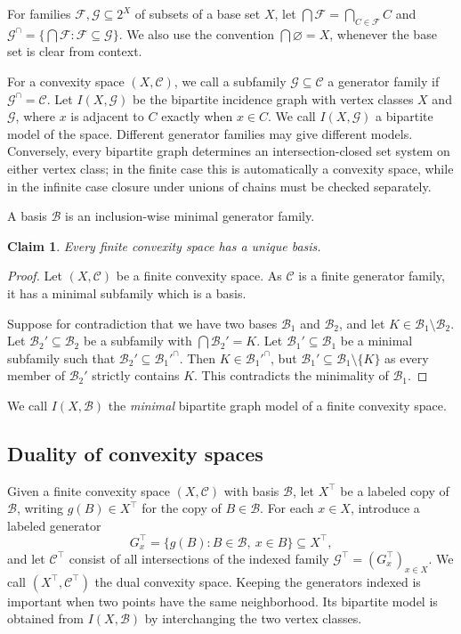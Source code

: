 \documentclass[11pt]{article}
\newtheorem{claim}[thm]{Claim}
\theoremstyle{definition}
\newcommand{\F}{\mathcal{F}}
\newcommand{\C}{\mathcal{C}}
\newcommand{\B}{\mathcal{B}}
\newcommand{\G}{\mathcal{G}}
\begin{document}
For families $\F,\G \subseteq 2^X$ of subsets of a base set $X$, let $\bigcap \F = \bigcap_{C\in \F} C$ and $\G^\cap = \{\bigcap \F: \F \subseteq \G\}$.
We also use the convention $\bigcap \varnothing = X$, whenever the base set is clear from context.

For a convexity space $(X,\C)$, we call a subfamily $\G\subseteq\C$ a generator family if $\G^\cap=\C$. Let $I(X,\G)$ be the bipartite incidence graph with vertex classes $X$ and $\G$, where $x$ is adjacent to $C$ exactly when $x\in C$. We call $I(X,\G)$ a bipartite model of the space. Different generator families may give different models. Conversely, every bipartite graph determines an intersection-closed set system on either vertex class; in the finite case this is automatically a convexity space, while in the infinite case closure under unions of chains must be checked separately.

A basis $\B$ is an inclusion-wise minimal generator family.

\begin{claim}\label{cl:uniqueBasis}
    Every finite convexity space has a unique basis.
\end{claim}

\begin{proof}
    Let $(X,\C)$ be a finite convexity space. As $\C$ is a finite generator family, it has a minimal subfamily which is a basis.

    Suppose for contradiction that we have two bases $\B_1$ and $\B_2$, and let $K \in \B_1 \setminus \B_2$.  Let $\B_2' \subseteq \B_2$ be a subfamily with $\bigcap \B_2' = K$.  Let $\B_1' \subseteq \B_1$ be a minimal subfamily such that $\B_2' \subseteq \B_1'^\cap$. Then $K \in \B_1'^\cap$, but $\B_1' \subseteq \B_1 \setminus \{K\}$ as every member of $\B_2'$ strictly contains $K$. This contradicts the minimality of $\B_1$.
\end{proof}

We call $I(X,\B)$ the \emph{minimal} bipartite graph model of a finite convexity space.



\subsection{Duality of convexity spaces}\label{subsec:bipartite:duality}


Given a finite convexity space $(X,\C)$ with basis $\B$, let $X^\top$ be a labeled copy of $\B$, writing $g(B)\in X^\top$ for the copy of $B\in\B$. For each $x\in X$, introduce a labeled generator
\[
G_x^\top=\{g(B):B\in\B,\ x\in B\}\subseteq X^\top,
\]
and let $\C^\top$ consist of all intersections of the indexed family $\G^\top=(G_x^\top)_{x\in X}$. We call $(X^\top,\C^\top)$ the dual convexity space. Keeping the generators indexed is important when two points have the same neighborhood. Its bipartite model is obtained from $I(X,\B)$ by interchanging the two vertex classes.
\end{document}
